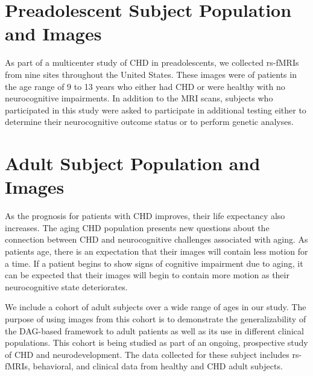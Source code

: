 \section{Preadolescent Subject Population and Images}

As part of a multicenter study of CHD in preadolescents, we collected rs-fMRIs from nine sites throughout the United States. These images were of patients in the age range of 9 to 13 years who either had CHD or were healthy with no neurocognitive impairments. In addition to the MRI scans, subjects who participated in this study were asked to participate in additional testing  either to determine their neurocognitive outcome status or to perform genetic analyses. %



\section{Adult Subject Population and Images}

As the prognosis for patients with CHD improves, their life expectancy also increases. The aging CHD population presents new questions about the connection between CHD and neurocognitive challenges associated with aging. As patients age, there is an expectation that their images will contain less motion for a time. If a patient begins to show signs of cognitive impairment due to aging, it can be expected that their images will begin to contain more motion as their neurocognitive state deteriorates. 

We include a cohort of adult subjects over a wide range of ages in our study. The purpose of using images from this cohort is to demonstrate the generalizability of the DAG-based framework to adult patients as well as its use in different clinical populations. This cohort is being studied as part of an ongoing, prospective study of CHD and neurodevelopment. The data collected for these subject includes rs-fMRIs, behavioral, and clinical data from healthy and CHD adult subjects. 


